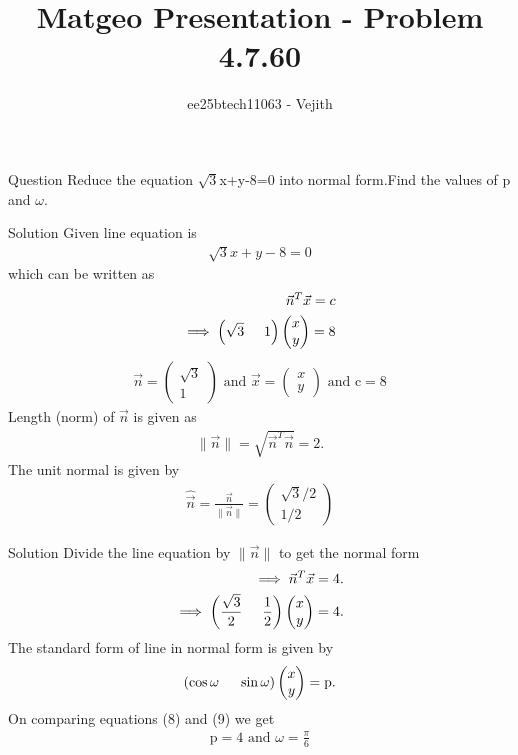 \documentclass{beamer}
\title{Matgeo Presentation - Problem 4.7.60}
\author{ee25btech11063 - Vejith}
\numberwithin{equation}{section}
\providecommand{\brak}[1]{\ensuremath{\left(#1\right)}}
\theoremstyle{remark}
\providecommand{\norm}[1]{\lVert#1\rVert}
\newcommand{\myvec}[1]{\ensuremath{\begin{pmatrix}#1\end{pmatrix}}}
\begin{document}
\frame{\titlepage}
\begin{frame}{Question}
Reduce the equation $\sqrt{3}$x+y-8=0 into normal form.Find the values of p and $\omega$.
\end{frame}

\begin{frame}{Solution}
    Given line equation is
\begin{align}
    \sqrt{3}x+y-8=0
\end{align} which can be written as 
\begin{align}
    \Vec{n}^T\Vec{x}=c\\
    \implies \brak{\sqrt{3}\hspace{0.5cm}1}\myvec{x\\y}=8
\end{align}
\begin{align}
    \Vec{n}=\myvec{\sqrt{3}\\1} \text{ and } \Vec{x}=\myvec{x\\y} \text{ and c}=8
\end{align}
Length (norm) of  $\Vec{n}$ is given as
\begin{align}
    \norm{\Vec{n}}=\sqrt{\Vec{n}^T\Vec{n}}=2.
\end{align}
The unit normal is given by
\begin{align}
    \hat{\Vec{n}}=\frac{\Vec{n}}{\norm{\Vec{n}}}=\myvec{\sqrt{3}/2 \\ 1/2}
\end{align}
\end{frame}
\begin{frame}{Solution}
    Divide the line equation by $\norm{\Vec{n}}$ to get the normal form
\begin{align}
    \implies \Vec{n}^T\Vec{x}=4.\\
    \implies \brak{\frac{\sqrt{3}}{2} \hspace{0.5cm} \frac{1}{2}}\myvec{x\\y}=4.
    \end{align}
The standard form of line in normal form is given by 
\begin{align}
 \brak{\cos{\omega}\hspace{0.5cm}\sin{\omega}}\myvec{x\\y}=\text{p}.   
\end{align}
   On comparing equations (8) and (9) we get
   \begin{align}
       \text{p}=4 \text{ and }\omega=\frac{\pi}{6}
   \end{align}
\end{frame}
\end{document}
